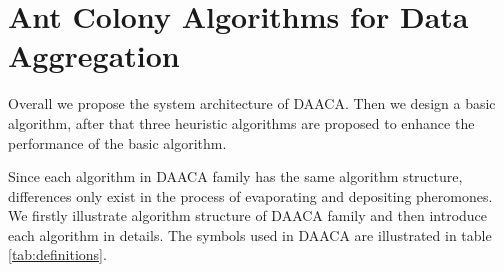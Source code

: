 \documentclass{elsarticle}
\begin{document}
\section{Ant Colony Algorithms for Data Aggregation} \label{AntColonyAlgorithmforDataAggregation}

Overall we propose the system architecture of DAACA. Then we design a basic algorithm, after that three heuristic algorithms are proposed to enhance the performance of the basic algorithm.

Since each algorithm in DAACA family has the same algorithm structure, differences only exist in the process of evaporating and depositing pheromones. We firstly illustrate algorithm structure of DAACA family and then introduce each algorithm in details. The symbols used in DAACA are illustrated in table \ref{tab:definitions}.
\end{document}
